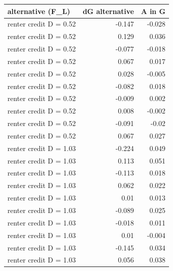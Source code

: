 \begin{tabular}{lrr}
\toprule
alternative (F\_L) & dG alternative & A in G \\
\midrule
renter credit D = 0.52 & -0.147 & -0.028 \\
renter credit D = 0.52 & 0.129 & 0.036 \\
renter credit D = 0.52 & -0.077 & -0.018 \\
renter credit D = 0.52 & 0.067 & 0.017 \\
renter credit D = 0.52 & 0.028 & -0.005 \\
renter credit D = 0.52 & -0.082 & 0.018 \\
renter credit D = 0.52 & -0.009 & 0.002 \\
renter credit D = 0.52 & 0.008 & -0.002 \\
renter credit D = 0.52 & -0.091 & -0.02 \\
renter credit D = 0.52 & 0.067 & 0.027 \\
renter credit D = 1.03 & -0.224 & 0.049 \\
renter credit D = 1.03 & 0.113 & 0.051 \\
renter credit D = 1.03 & -0.113 & 0.018 \\
renter credit D = 1.03 & 0.062 & 0.022 \\
renter credit D = 1.03 & 0.01 & 0.013 \\
renter credit D = 1.03 & -0.089 & 0.025 \\
renter credit D = 1.03 & -0.018 & 0.011 \\
renter credit D = 1.03 & 0.01 & -0.004 \\
renter credit D = 1.03 & -0.145 & 0.034 \\
renter credit D = 1.03 & 0.056 & 0.038 \\
\bottomrule
\end{tabular}
